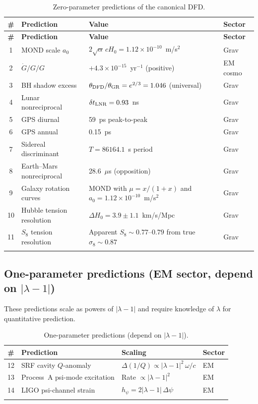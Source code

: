 \documentclass[11pt]{article}
\newcommand{\ee}[1]{\times 10^{#1}}
\newcommand{\Gdot}{\dot{G}/G}
\newcommand{\aM}{a_0}
\newcommand{\Hzero}{H_0}
\newcommand{\lamdiff}{|\lambda{-}1|}
\newcommand{\mufd}{\mu}
\begin{document}
\begin{longtable}{clp{5.5cm}l}
\toprule
\textbf{\#} & \textbf{Prediction} & \textbf{Value} & \textbf{Sector} \\
\midrule
\endfirsthead
\toprule
\textbf{\#} & \textbf{Prediction} & \textbf{Value} & \textbf{Sector} \\
\midrule
\endhead
1 & MOND scale $\aM$ & $2\sqrt{\alpha}\,c\Hzero = 1.12\ee{-10}$~m/s$^2$
  & Grav \\
2 & $\Gdot/G$ & $+4.3\ee{-15}$~yr$^{-1}$ (positive) & EM cosmo \\
3 & BH shadow excess & $\theta_{\rm DFD}/\theta_{\rm GR} = e^{2/3}
  = 1.046$ (universal) & Grav \\
4 & Lunar nonreciprocal & $\delta t_{\rm LNR} = 0.93$~ns & Grav \\
5 & GPS diurnal & 59~ps peak-to-peak & Grav \\
6 & GPS annual & 0.15~ps & Grav \\
7 & Sidereal discriminant & $T = 86164.1$~s period & Grav \\
8 & Earth--Mars nonreciprocal & 28.6~$\mu$s (opposition) & Grav \\
9 & Galaxy rotation curves & MOND with $\mufd = x/(1+x)$ and
  $\aM = 1.12\ee{-10}$~m/s$^2$ & Grav \\
10 & Hubble tension resolution &
  $\Delta\Hzero = 3.9 \pm 1.1$~km/s/Mpc & Grav \\
11 & $S_8$ tension resolution &
  Apparent $S_8 \sim 0.77$--$0.79$ from true $\sigma_8 \sim 0.87$
  & Grav \\
\bottomrule
\caption{Zero-parameter predictions of the canonical DFD.}
\label{tab:zero-param}
\end{longtable}

\subsection{One-parameter predictions (EM sector, depend on $\lamdiff$)}

These predictions scale as powers of $\lamdiff$ and require knowledge
of $\lambda$ for quantitative prediction.

\begin{longtable}{clp{5.5cm}l}
\toprule
\textbf{\#} & \textbf{Prediction} & \textbf{Scaling} & \textbf{Sector} \\
\midrule
12 & SRF cavity $Q$-anomaly & $\Delta(1/Q) \propto \lamdiff^2\,\omega/c$
  & EM \\
13 & Process~A psi-mode excitation & Rate $\propto \lamdiff^2$
  & EM \\
14 & LIGO psi-channel strain & $h_\psi = 2\lamdiff\,\Delta\psi$
  & EM \\
\bottomrule
\caption{One-parameter predictions (depend on $\lamdiff$).}
\label{tab:one-param}
\end{longtable}
\end{document}
